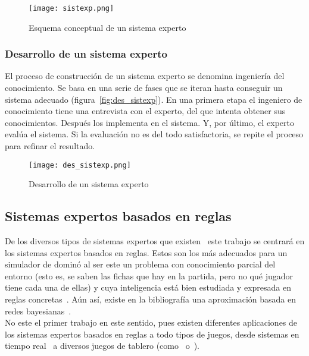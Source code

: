 \begin{figure}[h]
  \begin{center}
    \texttt{[image: sistexp.png]}
  \end{center}
  \caption{Esquema conceptual de un sistema experto}
  \label{fig:sistexp}
\end{figure}

\subsubsection{Desarrollo de un sistema experto}

El proceso de construcción de un sistema experto se denomina ingeniería del conocimiento. Se basa en una serie de fases que se iteran hasta conseguir un sistema adecuado (figura~\vref{fig:des_sistexp}). En una primera etapa el ingeniero de conocimiento tiene una entrevista con el experto, del que intenta obtener sus conocimientos. Después los implementa en el sistema. Y, por último, el experto evalúa el sistema. Si la evaluación no es del todo satisfactoria, se repite el proceso para refinar el resultado. \\

\begin{figure}[h]
  \begin{center}
    \texttt{[image: des\_sistexp.png]}
  \end{center}
  \caption{Desarrollo de un sistema experto}
  \label{fig:des_sistexp}
\end{figure}


\subsection{Sistemas expertos basados en reglas}

De los diversos tipos de sistemas expertos que existen~\cite{ShuHsienLiao200593} este trabajo se centrará en los sistemas expertos basados en reglas. Estos son los más adecuados para un simulador de dominó al ser este un problema con conocimiento parcial del entorno (esto es, se saben las fichas que hay en la partida, pero no qué jugador tiene cada una de ellas) y cuya inteligencia está bien estudiada y expresada en reglas concretas~\cite{Borrajo1990129}. Aún así, existe en la bibliografía una aproximación basada en redes bayesianas~\cite{PFCRoss}. \\

No este el primer trabajo en este sentido, pues existen diferentes aplicaciones de los sistemas expertos basados en reglas a todo tipos de juegos, desde sistemas en tiempo real~\cite{DBLP:conf/robocup/FathzadehMMS05} a diversos juegos de tablero (como~\cite{PFCRecio} o~\cite{PFCChaves}). \\

